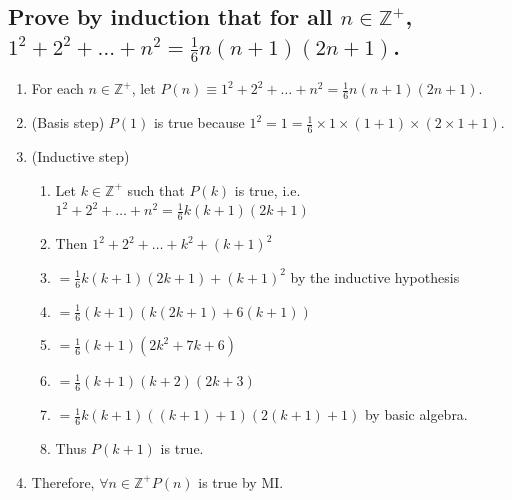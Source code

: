 \documentclass{article}
\begin{document}
\subsection*{Prove by induction that for all $n\in\mathbb{Z}^{+}$, $1^{2} + 2^{2} + \dots + n^{2} = \frac{1}{6}n(n+1)(2n+1)$.}
\begin{enumerate}
	\item For each $n\in\mathbb{Z}^{+}$, let $P(n)\equiv 1^{2} + 2^{2} + \dots + n^{2} = \frac{1}{6}n(n+1)(2n+1)$.
	\item (Basis step) $P(1)$ is true because $1^{2} = 1 = \frac{1}{6}\times 1\times (1+1)\times(2\times1+1)$.
	\item (Inductive step)
	\begin{enumerate}
		\item Let $k\in\mathbb{Z}^{+}$ such that $P(k)$ is true, i.e. $1^{2} + 2^{2} + \dots + n^{2} = \frac{1}{6}k(k+1)(2k+1)$
		\item Then $1^{2} + 2^{2} + \dots + k^{2} + (k+1)^{2}$
		\item $= \frac{1}{6}k(k+1)(2k+1) + (k+1)^{2}$ \qquad by the inductive hypothesis
		\item $= \frac{1}{6}(k+1)(k(2k+1)+6(k+1))$
		\item $= \frac{1}{6}(k+1)(2k^{2} + 7k + 6)$
		\item $= \frac{1}{6}(k+1)(k+2)(2k+3)$
		\item $= \frac{1}{6}k(k+1)((k+1)+1)(2(k+1)+1)$ \qquad by basic algebra.
		\item Thus $P(k+1)$ is true.
	\end{enumerate}
	\item Therefore, $\forall n\in\mathbb{Z}^{+} P(n)$ is true by MI.
\end{enumerate}

\vspace{0.1cm}
\end{document}
